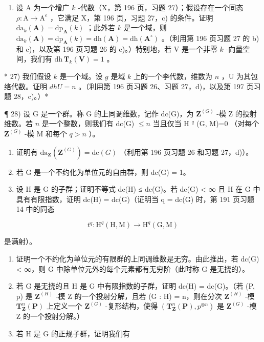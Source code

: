 \begin{enumerate}
\def\labelenumi{\arabic{enumi})}
\setcounter{enumi}{25}
\tightlist
\item
  设 A 为一个增广 \(k\) -代数（X，第 196 页，习题 27）；假设存在一个同态 \(\rho: \mathrm{A} \to \mathrm{A}^e\) ，它满足 X，第 196 页，习题 27，c) 的条件。证明 \(\mathrm{da}_k(\mathbf{A}) = \mathrm{dp}_\mathbf{A}(k)\) ；此外若 \(k\) 是一个域，则 \(\mathrm{da}_k(\mathbf{A}) = \mathrm{dp}_\mathbf{A}(k) = \mathrm{dh}(\mathbf{A}) = \mathrm{dh}(\mathbf{A}^\circ)\) 。（利用第 196 页习题 27 的 b) 和 c)，以及第 196 页习题 26 的 e)。）特别地，若 V 是一个非零 \(k\) -向量空间，我们有 \(\mathrm{dh}\,\mathbf{T}_k(\mathbf{V}) = 1\) 。
\end{enumerate}

* 27) 我们假设 \(k\) 是一个域。设 \(g\) 是域 \(k\) 上的一个李代数，维数为 \(n\) ，U 为其包络代数。证明 \(dhU = n\) 。（利用第 196 页习题 26、习题 27，d)，以及第 197 页习题 28，c)。）*

¶ 28) 设 G 是一个群。称 G 的上同调维数，记作 dc(G)，为 \(\mathbf{Z}^{(G)}\) -模 Z 的投射维数。若 \(n\) 是一个整数，则我们有 dc(G) \(\leqslant n\) 当且仅当 H \(^{q}\) (G, M)=0 （对每个 \(\mathbf{Z}^{(G)}\) -模 M 和每个 \(q > n\) ）。

\begin{enumerate}
\def\labelenumi{\alph{enumi})}
\item
  证明有 \(\mathrm{da}_{\mathbf{Z}}(\mathbf{Z}^{(G)}) = \mathrm{dc}(G)\) （利用第 196 页习题 26 和习题 27，d)）。
\item
  若 G 是一个不约化为单位元的自由群，则 dc(G) = 1。
\item
  设 H 是 G 的子群；证明不等式 dc(H) ≤ dc(G)。若 dc(G) \textless{} ∞ 且 H 在 G 中具有有限指数，证明 dc(H) = dc(G)（证明当 q = dc(G) 时，第 191 页习题 14 中的同态
\end{enumerate}

\[
t ^ {q}: \mathrm{H} ^ {q} (\mathrm{H}, \mathrm{M}) \rightarrow \mathrm{H} ^ {q} (\mathrm{G}, \mathrm{M})
\]

是满射）。

\begin{enumerate}
\def\labelenumi{\alph{enumi})}
\setcounter{enumi}{3}
\item
  证明一个不约化为单位元的有限群的上同调维数是无穷。由此推出，若 dc(G) \textless{} ∞，则 G 中除单位元外的每个元素都有无穷阶（此时称 G 是无挠的）。
\item
  若 G 是无挠的且 H 是 G 中有限指数的子群，证明 dc(H) = dc(G)。（若 (P, p) 是 \(\mathbf{Z}^{(H)}\) -模 Z 的一个投射分解，且若 (G : H) = n，则在分次 \(\mathbf{Z}^{(H)}\) -模 \(\mathbf{T}_{\mathbf{Z}}^{n}(\mathbf{P})\) 上定义一个 \(\mathbf{Z}^{(G)}\) -复形结构，使得 \((\mathbf{T}_{\mathbf{Z}}^{n}(\mathbf{P}), p^{\otimes n})\) 是 \(\mathbf{Z}^{(G)}\) -模 Z 的一个投射分解。）
\item
  若 H 是 G 的正规子群，证明我们有
\end{enumerate}

